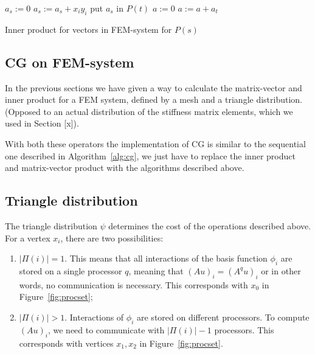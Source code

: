\documentclass[11pt]{amsart}
\theoremstyle{definition}
\begin{document}
\begin{algorithm}[H]
  $a_s := 0$\;
	 {
	  $a_s := a_s + x_i y_i$\;
	}
   {
		put $a_s$ in $P(t)$\;
	}
  $a := 0$\;
   {
		$a := a + a_t$\;
	}
 \caption{Inner product for vectors in FEM-system for $P(s)$}
 \label{alg:fem_ip}
\end{algorithm}

\subsection{CG on FEM-system}
In the previous sections we have given a way to calculate the matrix-vector and inner product for a FEM system, defined by a mesh and a triangle distribution. (Opposed to an actual distribution of the stiffness matrix elements, which we used in Section [x]).

With both these operators the implementation of CG is similar to the sequential one described in Algorithm~\ref{alg:cg}, we just have to replace the inner product and matrix-vector product with the algorithms described above.
\subsection{Triangle distribution}
The triangle distribution $\psi$ determines the cost of the operations described above. For a vertex $x_i$, there are two possibilities:
\begin{enumerate}
  \item $|\Pi(i)| = 1$. This means that all interactions of the basis function $\phi_i$ are stored on a single processor $q$, meaning that $(Au)_i = (A^qu)_i$ or in other words, no communication is necessary. This corresponds with $x_0$ in Figure~\ref{fig:procset};
  \item $|\Pi(i)| > 1$. Interactions of $\phi_i$ are stored on different processors. To compute $(Au)_i$, we need to communicate with $|\Pi(i)|-1$ processors. This corresponds with vertices $x_1, x_2$ in Figure~\ref{fig:procset}.
\end{enumerate}
\end{document}
